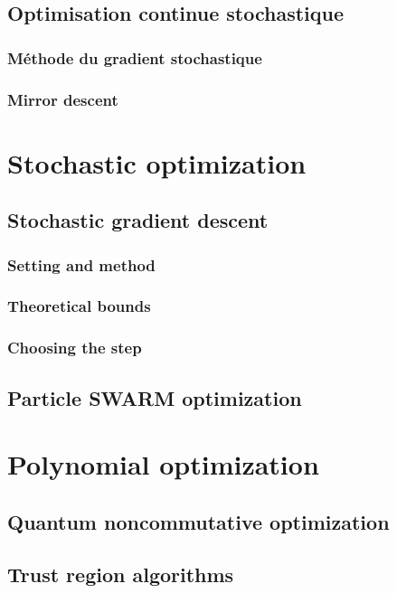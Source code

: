 \documentclass[12pt]{book}
\begin{document}
\section{Optimisation continue stochastique}
\subsection{Méthode du gradient stochastique}
\subsection{Mirror descent}

\chapter{Stochastic optimization}

\section{Stochastic gradient descent}
\subsection{Setting and method}
\subsection{Theoretical bounds}
\subsection{Choosing the step}
\section{Particle SWARM optimization}

\chapter{Polynomial optimization}

\section{Quantum noncommutative optimization}

\section{Trust region algorithms}
\end{document}
